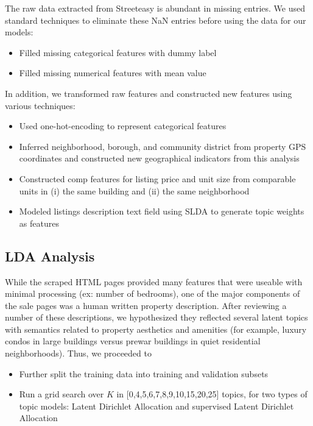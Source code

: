 \documentclass[journal]{IEEEtran}
\begin{document}
The raw data extracted from Streeteasy is abundant in missing entries. We used standard techniques to eliminate these NaN entries before using the data for our models:
\begin{itemize}
    \item Filled missing categorical features with dummy label
    \item Filled missing numerical features with mean value
\end{itemize}
In addition, we transformed raw features and constructed new features using various techniques:
\begin{itemize}
    \item Used one-hot-encoding to represent categorical features
    \item Inferred neighborhood, borough, and community district from property GPS coordinates and constructed new geographical indicators from this analysis 
    \item Constructed comp features for listing price and unit size from comparable units in (i) the same building and (ii) the same neighborhood
    \item Modeled listings description text field using SLDA to generate topic weights as features
\end{itemize}

\subsection*{LDA Analysis}

While the scraped HTML pages provided many features that were useable with minimal processing (ex: number of bedrooms), one of the major components of the sale pages was a human written property description. After reviewing a number of these descriptions, we hypothesized they reflected several latent topics with semantics related to property aesthetics and amenities (for example, luxury condos in large buildings versus prewar buildings in quiet residential neighborhoods). Thus, we proceeded to
\begin{itemize}
    \item Further split the training data into training and validation subsets
    \item Run a grid search over $K$ in [0,4,5,6,7,8,9,10,15,20,25] topics, for two types of topic models: Latent Dirichlet Allocation \cite{blei2003latent} and supervised Latent Dirichlet Allocation \cite{mcauliffe2008supervised}
\end{itemize}
\end{document}
